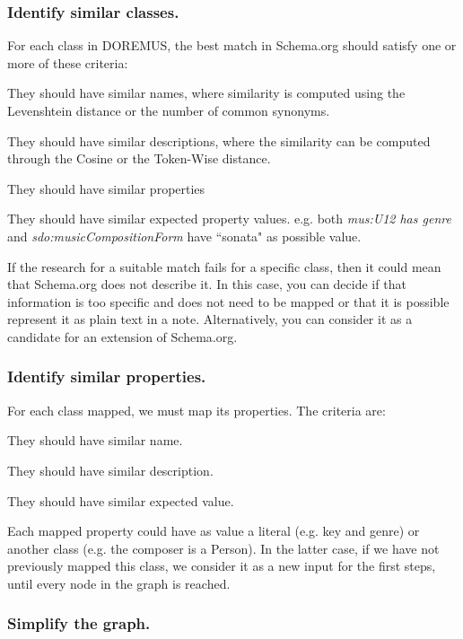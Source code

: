 \documentclass{llncs}
\begin{document}
\subsubsection{Identify similar classes.}
\label{sec:classmap}
For each class in DOREMUS, the best match in Schema.org should satisfy one or more of these criteria:
\begin{enumerate*}
 \item{
They should have similar names, where similarity is computed using the Levenshtein distance or the number of common synonyms.
}
 \item{They should have similar descriptions, where the similarity can be computed through the Cosine or the Token-Wise distance.}
 \item{They should have similar properties}
 \item{They should have similar expected property values.
e.g. both \textit{mus:U12 has genre} and \textit{sdo:musicCompositionForm} have ``sonata" as possible value.
}
\end{enumerate*}

If the research for a suitable match fails for a specific class, then it could mean that Schema.org does not describe it. In this case, you can decide if that information is too specific and does not need to be mapped or that it is possible represent it as plain text in a note. Alternatively, you  can consider it as a candidate for an extension of Schema.org.

\subsubsection{Identify similar properties.}
For each class mapped, we must map its properties. The criteria are:
\begin{enumerate*}
 \item{They should have similar name.}
 \item{They should have similar description.}
 \item{They should have similar expected value.}
\end{enumerate*}

Each mapped property could have as value a literal (e.g. key and genre) or another class  (e.g. the composer is a Person). In the latter case, if we have not previously mapped this class, we consider it as a new input for the first steps, until every node in the graph is reached.

\subsubsection{Simplify the graph.}
\end{document}
